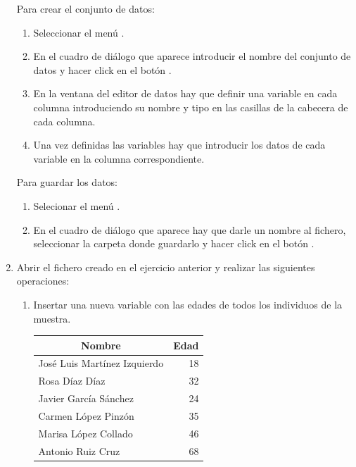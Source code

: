 \begin{enumerate}[leftmargin=*]
\begin{indicacion}{ Para crear el conjunto de datos:
\begin{enumerate}
\item Seleccionar el menú .
\item En el cuadro de diálogo que aparece introducir el nombre del conjunto de datos  y hacer click en el botón .
\item En la ventana del editor de datos hay que definir una variable en cada columna introduciendo su nombre y tipo en las casillas de la cabecera de cada columna.
\item Una vez definidas las variables hay que introducir los datos de cada variable en la columna correspondiente. 
\end{enumerate}
Para guardar los datos:
\begin{enumerate}
\item Selecionar el menú .
\item En el cuadro de diálogo que aparece hay que darle un nombre al fichero, seleccionar la carpeta donde guardarlo y hacer click en el
botón .
\end{enumerate}
}
\end{indicacion}

\item Abrir el fichero creado en el ejercicio anterior y realizar las siguientes operaciones:

\begin{enumerate}
\item Insertar una nueva variable  con las edades de todos los individuos de la muestra.
\begin{center}
\begin{tabular}{|l|r|}
\hline
\multicolumn{1}{|c|}{Nombre} & \multicolumn{1}{c|}{Edad} \\
\hline
José Luis Martínez Izquierdo & 18 \\
Rosa Díaz Díaz & 32 \\
Javier García Sánchez & 24 \\
Carmen López Pinzón & 35 \\
Marisa López Collado & 46 \\
Antonio Ruiz Cruz & 68 \\
\hline
\end{tabular}
\end{center}


\end{enumerate}
\end{enumerate}
